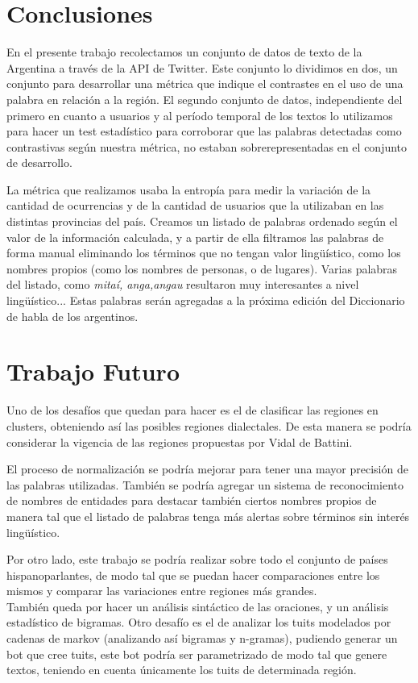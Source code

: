
\section{Conclusiones}
En el presente trabajo recolectamos un conjunto de datos de texto de la Argentina a través de la API de Twitter. Este conjunto lo dividimos en dos, un conjunto para desarrollar una métrica que indique el contrastes en el uso de una palabra en relación a la región. El segundo conjunto de datos, independiente del primero en cuanto a usuarios y al período temporal de los textos lo utilizamos para hacer un test estadístico para corroborar que las palabras detectadas como contrastivas según nuestra métrica, no estaban sobrerepresentadas en el conjunto de desarrollo.

La métrica que realizamos usaba la entropía para medir la variación de la cantidad de ocurrencias y de la cantidad de usuarios que la utilizaban en las distintas provincias del país. Creamos un listado de palabras ordenado según el valor de la información calculada, y a partir de ella filtramos las palabras de forma manual eliminando los términos que no tengan valor lingüístico, como los nombres propios (como los nombres de personas, o de lugares). Varias palabras del listado, como \textit{mitaí, anga,angau} resultaron muy interesantes a nivel lingüístico... Estas palabras serán agregadas a la próxima edición del Diccionario de habla de los argentinos.

\section{Trabajo Futuro}

Uno de los desafíos que quedan para hacer es el de clasificar las regiones en clusters, obteniendo así las posibles regiones dialectales. De esta manera se podría considerar la vigencia de las regiones propuestas por Vidal de Battini. %

El proceso de normalización se podría mejorar para tener una mayor precisión de las palabras utilizadas. También se podría agregar un sistema de reconocimiento de nombres de entidades para destacar también ciertos nombres propios de manera tal que el listado de palabras tenga más alertas sobre términos sin interés lingüístico.

Por otro lado, este trabajo se podría realizar sobre todo el conjunto de países hispanoparlantes, de modo tal que se puedan hacer comparaciones entre los mismos y comparar las variaciones entre regiones más grandes.\\

También queda por hacer un análisis sintáctico de las oraciones, y un análisis estadístico de bigramas.
Otro desafío es el de analizar los tuits modelados por cadenas de markov (analizando así bigramas y n-gramas), pudiendo generar un bot que cree tuits, este bot podría ser parametrizado de modo tal que genere textos, teniendo en cuenta únicamente los tuits de determinada región.

